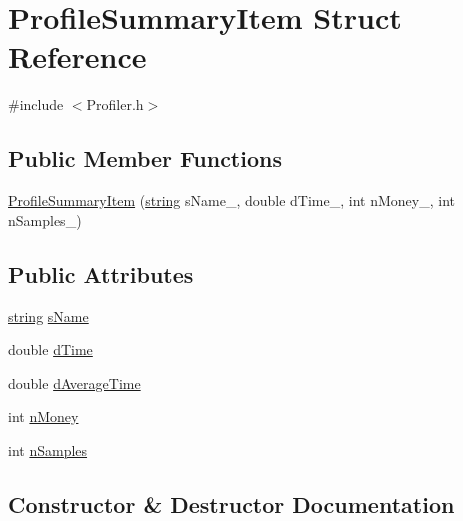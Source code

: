 \hypertarget{struct_profile_summary_item}{}\section{Profile\+Summary\+Item Struct Reference}
\label{struct_profile_summary_item}


{\ttfamily \#include $<$Profiler.\+h$>$}

\subsection*{Public Member Functions}
\begin{DoxyCompactItemize}
\item 
\hyperlink{struct_profile_summary_item_a67f0869459544c2ec935a33bbd8e3b29}{Profile\+Summary\+Item} (\hyperlink{testfpzip_8cpp_a984bb8e04129c4268bd6ff36a50c9fa4}{string} s\+Name\+\_\+, double d\+Time\+\_\+, int n\+Money\+\_\+, int n\+Samples\+\_\+)
\end{DoxyCompactItemize}
\subsection*{Public Attributes}
\begin{DoxyCompactItemize}
\item 
\hyperlink{testfpzip_8cpp_a984bb8e04129c4268bd6ff36a50c9fa4}{string} \hyperlink{struct_profile_summary_item_ae37c58451ea8907b3b6580066bf48a71}{s\+Name}
\item 
double \hyperlink{struct_profile_summary_item_a0b2da66b3214112dd90e2837fa5fad6d}{d\+Time}
\item 
double \hyperlink{struct_profile_summary_item_abf81dcdf80bc064ca974259d2df1780f}{d\+Average\+Time}
\item 
int \hyperlink{struct_profile_summary_item_adf0a4305b7b6fa164400f9c88e3f925d}{n\+Money}
\item 
int \hyperlink{struct_profile_summary_item_adb8b4578844aaa85bd0bd7f970e23959}{n\+Samples}
\end{DoxyCompactItemize}


\subsection{Constructor \& Destructor Documentation}
\hypertarget{struct_profile_summary_item_a67f0869459544c2ec935a33bbd8e3b29}{}
